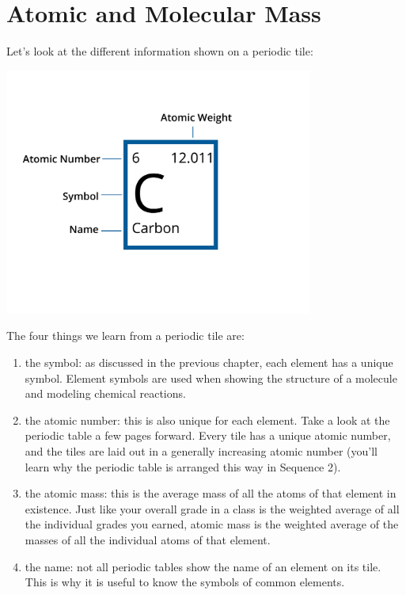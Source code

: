 \chapter{Atomic and Molecular Mass}


Let's look at the different information shown on a periodic tile:

\begin{center}
\includegraphics[width = 4in]{element.png}
\end{center}

The four things we learn from a periodic tile are:
\begin{enumerate}
\item the symbol: as discussed in the previous chapter, each element has a unique symbol. Element symbols are used when showing the structure of a molecule and modeling chemical reactions. 
\item the atomic number: this is also unique for each element. Take a look at the periodic table a few pages forward. Every tile has a unique atomic number, and the tiles are laid out in a generally increasing atomic number (you'll learn why the periodic table is arranged this way in Sequence 2). 
\item the atomic mass: this is the average mass of all the atoms of that element in existence. Just like your overall grade in a class is the weighted average of all the individual grades you earned, atomic mass is the weighted average of the masses of all the individual atoms of that element. 
\item the name: not all periodic tables show the name of an element on its tile. This is why it is useful to know the symbols of common elements. 
\end{enumerate}

